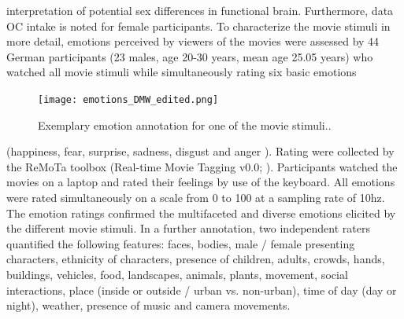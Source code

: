 \documentclass[11pt,a4paper]{article}
\begin{document}
interpretation of potential sex differences in functional brain. Furthermore, data OC intake is noted for 
female participants. To characterize the movie stimuli in more detail, emotions perceived by viewers of the movies were assessed by 
44 German participants (23 males, age 20-30 years, mean age 25.05 years) who watched all movie stimuli 
while simultaneously rating six basic emotions 
\begin{figure} %
  \vspace{-10pt} %
  \texttt{[image: emotions\_DMW\_edited.png]}
  \caption{Exemplary emotion annotation for one of the movie stimuli..}
  \label{fig:dmw}
\end{figure}
(happiness, fear, surprise, sadness, disgust and anger \parencite{ekmanConstantsCulturesFace1971a}). 
Rating were collected by the ReMoTa toolbox (Real-time Movie Tagging v0.0; \parencite{lettieriEmotionotopyHumanRight2019a}). 
Participants watched the movies on a laptop and rated their feelings by use of the keyboard. 
All emotions were rated simultaneously on a scale from 0 to 100 at a sampling rate of 10hz. 
The emotion ratings confirmed the multifaceted and diverse emotions elicited by the 
different movie stimuli. In a further annotation, two independent raters quantified the following 
features: faces, bodies, male / female presenting characters, ethnicity of characters, presence of children, 
adults, crowds, hands, buildings, vehicles, food, landscapes, animals, plants, movement, social interactions, 
place (inside or outside / urban vs. non-urban), time of day (day or night), weather, presence of music and 
camera movements.
\end{document}
